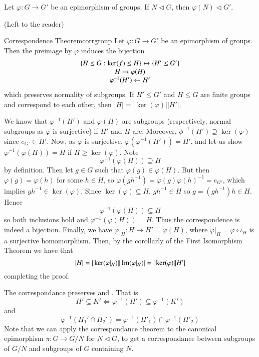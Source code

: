 \documentclass[12pt, a4paper, twoside, openright, titlepage]{book}
\begin{document}
\begin{prop}{}{}
        Let $\varphi:G\rightarrow G'$ be an epimorphism of groups. If $N \vartriangleleft G$, then $\varphi(N) \vartriangleleft G'$.
\end{prop}
\begin{proof*}{}{}
        (Left to the reader)
\end{proof*}

\begin{namthm}{Correspondence Theorem}{corrgroup}
        Let $\varphi:G\rightarrow G'$ be an epimorphism of groups. Then the preimage by $\varphi$ induces the bijection \begin{equation}
                        \map{\{H\leq G: \ker(f) \leq H\} \leftrightarrow \{H' \leq G'\}}{\map{H \mapsto \varphi(H)}{\varphi^{-1}(H') \mapsfrom H'}}
        \end{equation}
        which preserves normality of subgroups. If $H' \leq G'$ and $H \leq G$ are finite groups and correspond to each other, then $|H| = |\ker(\varphi)||H'|$.
\end{namthm}
\begin{proof*}{}{}
        We know that $\varphi^{-1}(H')$ and $\varphi(H)$ are subgroups (respectively, normal subgroups as $\varphi$ is surjective) if $H'$ and $H$ are. Moreover, $\phi^{-1}(H') \supseteq \ker(\varphi)$ since $e_{G'} \in H'$. Now, as $\varphi$ is surjcetive, $\varphi(\varphi^{-1}(H')) = H'$, and let us show $\varphi^{-1}(\varphi(H)) = H$ if $H\geq \ker(\varphi)$. Note $$\varphi^{-1}(\varphi(H)) \supseteq H$$ by definition. Then let $g \in G$ such that $\varphi(g) \in \varphi(H)$. But then $\varphi(g) = \varphi(h)$ for some $h \in H$, so $\varphi(gh^{-1}) = \varphi(g)\varphi(h)^{-1} = e_{G'}$, which implies $gh^{-1} \in \ker(\varphi)$. Since $\ker(\varphi) \subseteq H$, $gh^{-1} \in H$ so $g = (gh^{-1})h \in H$. Hence $$\varphi^{-1}(\varphi(H)) \subseteq H$$ so both inclusions hold and $\varphi^{-1}(\varphi(H)) = H$. Thus the correspondence is indeed a bijection. Finally, we have $\varphi\rvert_{H}:H\rightarrow H' = \varphi(H)$, where $\varphi\rvert_H = \varphi \circ \iota_H$ is a surjective homomorphism. Then, by the corollarly of the First Isomorphism Theorem we have that $$|H| = |\ker(\varphi\rvert_H)||\operatorname{Im}(\varphi\rvert_H)| = |\ker(\varphi)||H'|$$ completing the proof.
\end{proof*}


\begin{rmk}{}{}
        The correspondance preserves  and . That is \begin{equation}
                H'\subseteq K' \iff \varphi^{-1}(H') \subseteq \varphi^{-1}(K')
        \end{equation}
        and \begin{equation}
                \varphi^{-1}(H_1'\cap H_2') = \varphi^{-1}(H'_1) \cap \varphi^{-1}(H'_2)
        \end{equation}
        Note that we can apply the correspondance theorem to the canonical epimorphism $\pi:G\rightarrow G/N$ for $N \vartriangleleft G$, to get a correspondance between subgroups of $G/N$ and subgroups of $G$ containing $N$.
\end{rmk}
\end{document}

